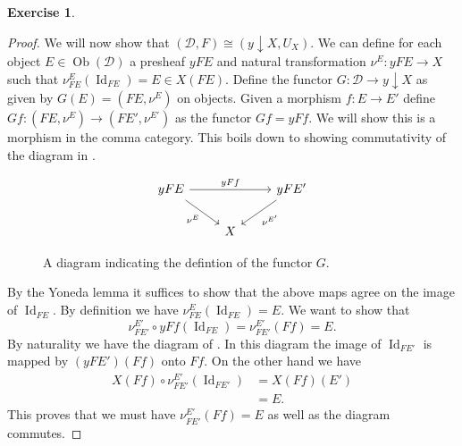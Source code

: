\documentclass{article}
\DeclareMathOperator{\Id}{Id}
\newcommand{\catt}{\mathcal{D}}
\DeclareMathOperator{\objects}{Ob}
\theoremstyle{definition}
\newtheorem{question}{Exercise}
\begin{document}
\begin{question}
\begin{enumerate}[(a)]
\begin{proof}
                  We will now show that \((\catt,F)\cong (y\downarrow
                  X,U_{X})\). We can define for each object
                  \(E\in\objects(\catt)\) a presheaf \(yFE\) and natural
                  transformation \(\nu^{E}:yFE\to X\) such that
                  \(\nu^{E}_{FE}(\Id_{FE})=E\in X(FE)\). Define the functor
                  \(G:\catt\to y\downarrow X\) as given by \(G(E)=(FE,\nu^{E})\)
                  on objects. Given a morphism \(f:E\to E'\) define
                  \(Gf:(FE,\nu^{E})\to (FE',\nu^{E'})\) as the functor
                  \(Gf=yFf\). We will show this is a morphism in the comma
                  category. This boils down to showing commutativity of the
                  diagram in .
                  \begin{figure}[H]
                      \[
                          \begin{tikzcd}[ampersand replacement=\&]
                              yFE \&\& {yFE'} \\
                              \& X
                              \arrow["{yFf}", from=1-1, to=1-3]
                              \arrow["{\nu^{E}}"', from=1-1, to=2-2]
                              \arrow["{\nu^{E'}}", from=1-3, to=2-2]
                          \end{tikzcd}
                      \]
                      \caption{A diagram indicating the defintion of the functor \(G\).}
                      \label{fig:comm-dia-4}
                  \end{figure}
                  By the Yoneda lemma it suffices to show that the above maps
                  agree on the image of \(\Id_{FE}\). By definition we have
                  \(\nu^{E}_{FE}(\Id_{FE})=E\). We want to show that
                  \[
                      \nu^{E'}_{FE'}\circ yFf(\Id_{FE})=\nu^{E'}_{FE'}(Ff)=E.
                  \]
                  By naturality we have the diagram of .
                  In this diagram the image of \(\Id_{FE'}\) is mapped by
                  \((yFE')(Ff)\) onto \(Ff\). On the other hand we have
                  \begin{align*}
                      X(Ff)\circ\nu^{E'}_{FE'}(\Id_{FE'}) & =X(Ff)(E') \\
                                                          & =E.
                  \end{align*}
                  This proves that we must have \(\nu^{E'}_{FE'}(Ff)=E\) as well
                  as the diagram commutes.

\end{proof}
\end{enumerate}
\end{question}
\end{document}
